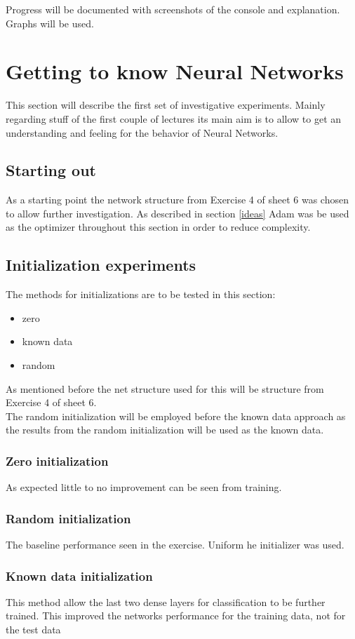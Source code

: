 \documentclass[]{article}
\begin{document}
Progress will be documented with screenshots of the console and explanation. Graphs will be used.

\section{Getting to know Neural Networks}
This section will describe the first set of investigative experiments. Mainly regarding stuff of the first couple of lectures its main aim is to allow to get an understanding and feeling for the behavior of Neural Networks.

\subsection{Starting out}
As a starting point the network structure from Exercise 4 of sheet 6 was chosen to allow further investigation. As described in section \ref{ideas} Adam was be used as the optimizer throughout this section in order to reduce complexity.

\subsection{Initialization experiments}
The methods for initializations are to be tested in this section:
\begin{itemize}
	\item zero
	\item known data
	\item random
\end{itemize}
As mentioned before the net structure used for this will be structure from Exercise 4 of sheet 6.\\
The random initialization will be employed before the known data approach as the results from the random initialization will be used as the known data.
\subsubsection{Zero initialization}
As expected little to no improvement can be seen from training.
\subsubsection{Random initialization}
The baseline performance seen in the exercise. Uniform he initializer was used.
\subsubsection{Known data initialization}
This method allow the last two dense layers for classification to be further trained. This improved the networks performance for the training data, not for the test data
\end{document}

